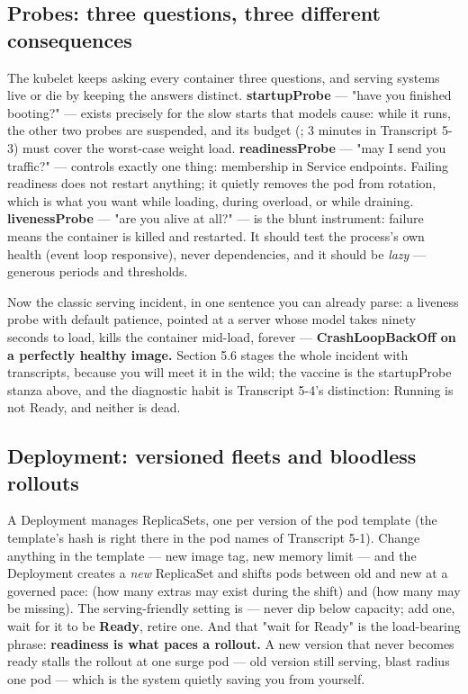 \subsection*{Probes: three questions, three different consequences}

The kubelet keeps asking every container three questions, and serving systems live or die by keeping the answers distinct. \textbf{startupProbe} — "have you finished booting?" — exists precisely for the slow starts that models cause: while it runs, the other two probes are suspended, and its budget (; 3 minutes in Transcript 5-3) must cover the worst-case weight load. \textbf{readinessProbe} — "may I send you traffic?" — controls exactly one thing: membership in Service endpoints. Failing readiness does not restart anything; it quietly removes the pod from rotation, which is what you want while loading, during overload, or while draining. \textbf{livenessProbe} — "are you alive at all?" — is the blunt instrument: failure means the container is killed and restarted. It should test the process's own health (event loop responsive), never dependencies, and it should be \textit{lazy} — generous periods and thresholds.

Now the classic serving incident, in one sentence you can already parse: a liveness probe with default patience, pointed at a server whose model takes ninety seconds to load, kills the container mid-load, forever — \textbf{CrashLoopBackOff on a perfectly healthy image.} Section 5.6 stages the whole incident with transcripts, because you will meet it in the wild; the vaccine is the startupProbe stanza above, and the diagnostic habit is Transcript 5-4's distinction: Running is not Ready, and neither is dead.

\subsection*{Deployment: versioned fleets and bloodless rollouts}

A Deployment manages ReplicaSets, one per version of the pod template (the template's hash is right there in the pod names of Transcript 5-1). Change anything in the template — new image tag, new memory limit — and the Deployment creates a \textit{new} ReplicaSet and shifts pods between old and new at a governed pace:  (how many extras may exist during the shift) and  (how many may be missing). The serving-friendly setting is  — never dip below capacity; add one, wait for it to be \textbf{Ready}, retire one. And that "wait for Ready" is the load-bearing phrase: \textbf{readiness is what paces a rollout.} A new version that never becomes ready stalls the rollout at one surge pod — old version still serving, blast radius one pod — which is the system quietly saving you from yourself.

